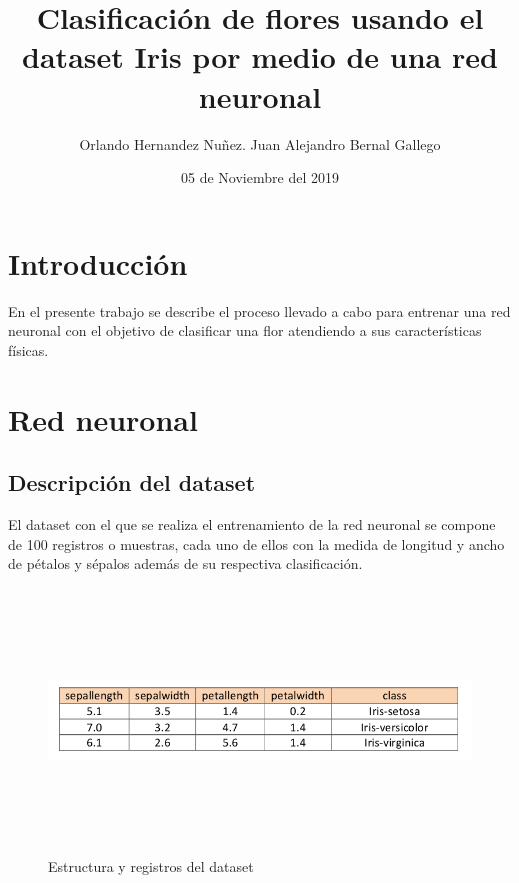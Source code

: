 \documentclass[11pt]{article}
\begin{document}
\title{ Clasificaci\'on de flores usando el dataset Iris por medio de una red neuronal }
\author{Orlando Hernandez Nu\~nez. Juan Alejandro Bernal Gallego}
\date{05 de Noviembre del 2019}
\maketitle
\section{Introducci\'on}
En el presente trabajo se describe el proceso llevado a cabo para entrenar una red neuronal con el objetivo de clasificar una flor atendiendo a sus caracter\'isticas f\'isicas.
\section{Red neuronal}
\subsection{Descripci\'on del dataset}
El dataset con el que se realiza el entrenamiento de la red neuronal se compone de 100 registros o muestras,
cada uno de ellos con la medida de longitud y ancho de p\'etalos y s\'epalos adem\'as de su respectiva clasificaci\'on.
\begin{figure}[ht]
    \includegraphics[width=13cm, height=7cm]{dt_example}
    \centering
    \caption{Estructura y registros del dataset}
    \label{fig:dt_example}
\end{figure}
\end{document}

